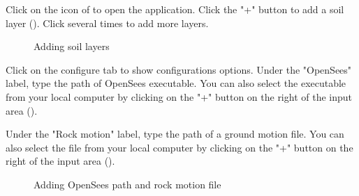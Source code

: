 

Click on the  icon of  \texttt{\getsoftwarename{}} to open the application.
Click the "+" button to add a soil layer (). Click several times to add more layers.

\begin{figure}[!htbp]
  \caption{Adding soil layers}
  \label{fig:addLayer}
\end{figure}


Click on the configure tab to show configurations options. 
Under the "OpenSees" label, type the path of OpenSees executable. 
You can also select the executable from your local computer by clicking on the "+" button on the right of the input area ().

Under the "Rock motion" label, type the path of a ground motion file. 
You can also select the file from your local computer by clicking on the "+" button on the right of the input area ().

\begin{figure}[!htbp]
  \caption{Adding OpenSees path and rock motion file}
  \label{fig:addOpenSees}
\end{figure}


